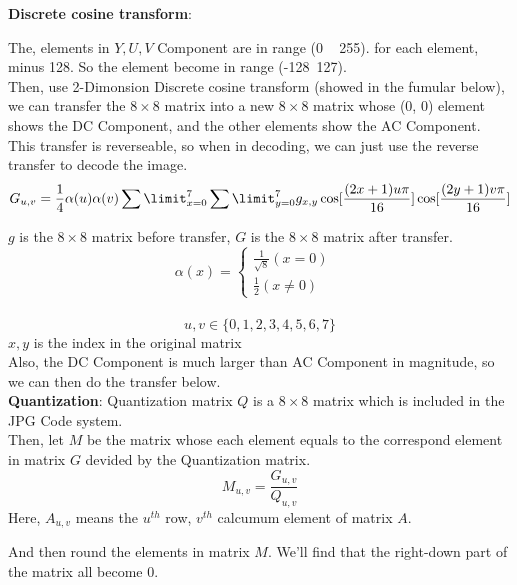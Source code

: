 \documentclass{article}
\begin{document}
	\textbf{Discrete cosine transform}:

		The, elements in $Y,U,V$ Component are in range (0 ~ 255). for each element, minus 128. So the element become in range (-128~127). \\

		Then, use 2-Dimonsion Discrete cosine transform (showed in the fumular below), we can transfer the $8 \times 8$ matrix into a new $8 \times 8$ matrix whose (0, 0) element shows the DC Component, and the other elements show the AC Component. This transfer is reverseable, so when in decoding, we can just use the reverse transfer to decode the image. \\

		$$G_{u,v} = \frac{1}{4} \alpha(u)\alpha(v)\sum\limit_{x = 0}^{7} \sum\limit_{y = 0}^{7} g_{x, y} \cos[\frac{(2x + 1)u \pi}{16}] \cos[\frac{(2y+1) v \pi}{16}]$$

		$g$ is the $8 \times 8$ matrix before transfer, $G$ is the $8 \times 8$ matrix after transfer.\\
		
		\begin{equation}
			\alpha(x) =
			\left\{
						 \begin{array}{lr}
							\frac{1}{\sqrt{8}} (x = 0) & \\
							\frac{1}{2} (x \neq 0) &

						 \end{array}
			\right.
		\end{equation} \\
		$$u, v \in \{0,1,2,3,4,5,6,7\}$$
		$x, y$ is the index in the original matrix \\

		Also, the DC Component is much larger than AC Component in magnitude, so we can then do the transfer below. \\

	\textbf{Quantization}:
		Quantization matrix $Q$ is a $8 \times 8$ matrix which is included in the JPG Code system. \\ Then, let $M$ be the matrix whose each element equals to the correspond element in matrix $G$ devided by the Quantization matrix. \\

		$$M_{u,v} = \frac{G_{u,v}}{Q_{u,v}}$$
		Here, $A_{u,v}$ means the $u^{th}$ row, $v^{th}$ calcumum element of matrix $A$.

		And then round the elements in matrix $M$. We'll find that the right-down part of the matrix all become $0$. \\
		
\end{document}
